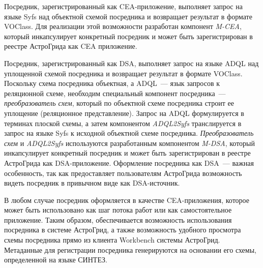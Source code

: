 \begin{multicols}{2}
     Посредник, зарегистрированный как CEA-при\-ло\-же\-ние, выполняет запрос на языке
Syfs над объектной схемой посредника и возвращает результат в формате VOClass. Для
реализации этой воз\-мож\-ности разработан компонент \textit{M-CEA}, который ин\-кап\-су\-ли\-ру\-ет
конкретный посредник и может быть зарегистрирован в реестре АстроГрида как CEA
приложение.

     Посредник, зарегистрированный как DSA, выполняет запрос на языке ADQL над
уплощенной схемой посредника и возвращает результат в формате VOClass. Поскольку
схема посредника объектная, а ADQL~--- язык запросов к реляционной схеме, необходим
специальный компонент посредника~--- \textit{преобразователь схем}, который по
объектной схеме посредника строит ее уплощение (реляци\-он\-ное представление). Запрос
на ADQL фор\-мули\-ру\-ет\-ся в терминах плоской схемы, а затем компонентом \textit{ADQL2Syfs}
транслируется в запрос на \mbox{языке} Syfs к исходной объектной схеме посредника.
\textit{Пре\-об\-разо\-ва\-тель схем} и \textit{ADQL2Syfs} используются разработанным компонентом
\textit{M-DSA}, который ин\-кап\-су\-ли\-ру\-ет конкретный посредник и может быть зарегистрирован
в реестре АстроГрида как DSA-приложение. Оформление посредника как DSA~--- важная
особенность, так как предоставляет пользователям Аст\-ро\-Гри\-да возможность видеть
посредник в привычном виде как DSA-источник.

 В любом случае посредник оформляется в %
 ка\-че\-ст\-ве CEA-при\-ло\-же\-ния, которое может быть
исполь\-зо\-ва\-но как шаг потока работ или как самостоятельное приложение. Таким
образом, обеспечивается возможность использования посредника в системе АстроГрид,
а также возможность удобного просмотра схемы посредника прямо из
клиента
Workbench системы АстроГрид. Метаданные для регистрации посредника
генерируются на основании его схемы, определенной на языке СИНТЕЗ.

\end{multicols}

\begin{figure} %
\vspace*{1pt}
\begin{center}
\mbox{%
\epsfxsize=161.67mm
}
\end{center}
\vspace*{-6pt}
\end{figure}

